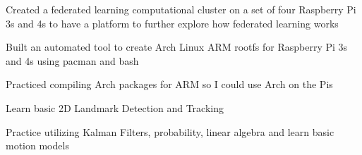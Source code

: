 \documentclass[letterpaper]{resume}
\begin{document}
\begin{compactitem}
\item Created a federated learning computational cluster on a set of four Raspberry Pi 3s and 4s to have a platform to further explore how federated learning works
\item Built an automated tool to create Arch Linux ARM rootfs for Raspberry Pi 3s and 4s using pacman and bash
\item Practiced compiling Arch packages for ARM so I could use Arch on the Pis
\end{compactitem}
 
\begin{compactitem}
\item Learn basic 2D Landmark Detection and Tracking
\item Practice utilizing Kalman Filters, probability, linear algebra and learn basic motion models
\end{compactitem}


\end{document}
